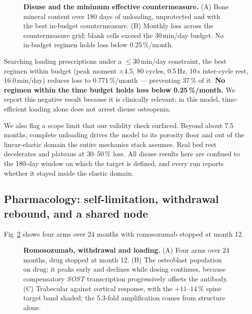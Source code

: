 \documentclass[10pt,letterpaper]{article}
\begin{document}
\begin{figure}[!h]
\caption{{\bf Disuse and the minimum effective countermeasure.}
(A) Bone mineral content over 180 days of unloading, unprotected and with the
best in-budget countermeasure. (B) Monthly loss across the countermeasure
grid; blank cells exceed the 30\,min/day budget. No in-budget regimen holds
loss below 0.25\,\%/month.}
\label{fig4}
\end{figure}

Searching loading prescriptions under a $\le$30\,min/day constraint, the best
regimen within budget (peak moment $\times$4.5, 80 cycles, 0.5\,Hz, 10\,s
inter-cycle rest, 16.0\,min/day) reduces loss to 0.771\,\%/month ---
preventing 37\,\% of it. \textbf{No regimen within the time budget holds loss
below 0.25\,\%/month.} We report this negative result because it is clinically
relevant: in this model, time-efficient loading alone does not arrest disuse
osteopenia.

We also flag a scope limit that our validity check surfaced. Beyond about 7.5
months, complete unloading drives the model to its porosity floor and out of
the linear-elastic domain the entire mechanics stack assumes. Real bed rest
decelerates and plateaus at 30--50\,\% loss. All disuse results here are
confined to the 180-day window on which the target is defined, and every run
reports whether it stayed inside the elastic domain.

\subsection*{Pharmacology: self-limitation, withdrawal rebound, and a shared node}

Fig~\ref{fig5} shows four arms over 24 months with romosozumab stopped at
month 12.

\begin{figure}[!h]
\caption{{\bf Romosozumab, withdrawal and loading.}
(A) Four arms over 24 months, drug stopped at month 12. (B) The osteoblast
population on drug: it peaks early and declines while dosing continues,
because compensatory \emph{SOST} transcription progressively offsets the
antibody. (C) Trabecular against cortical response, with the $+11$--$14\,\%$
spine target band shaded; the 5.3-fold amplification comes from structure
alone.}
\label{fig5}
\end{figure}
\end{document}
